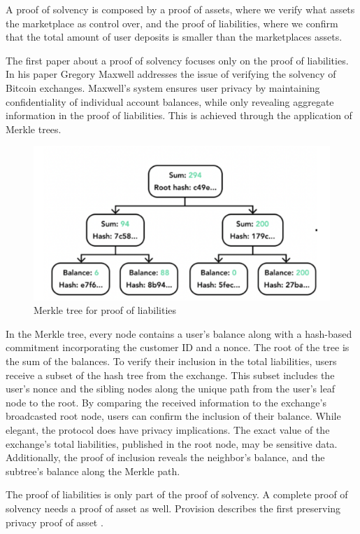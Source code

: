 A proof of solvency is composed by a proof of assets, where we verify what assets the marketplace as control over, and the proof of liabilities,
where we confirm that the total amount of user deposits is smaller than the marketplaces assets. 


The first paper about a proof of solvency focuses only on the proof of liabilities. In his paper Gregory Maxwell addresses the issue of verifying 
the solvency of Bitcoin exchanges. \cite{chainlink_blog}
Maxwell's system ensures user privacy by maintaining confidentiality of individual account balances, while only revealing aggregate information in the proof of liabilities. 
This is achieved through the application of Merkle trees. 

\begin{figure}[H]
    \centering
    \includegraphics[width=130mm]{MerkleTreeLiabilities.png}
    \caption{Merkle tree for proof of liabilities}
    \label{overflow}
    \end{figure}

In the Merkle tree, every node contains a user's balance along with a hash-based commitment incorporating the customer ID and a nonce. The root of the tree is the sum of the balances. 
To verify their inclusion in the total liabilities, users receive a subset of the hash tree from the exchange. This subset includes the user's nonce and the sibling nodes along the unique path from the user's leaf node to the root. 
By comparing the received information to the exchange's broadcasted root node, users can confirm the inclusion of their balance.
While elegant, the protocol does have privacy implications. The exact value of the exchange's total liabilities, published in the root node, may be sensitive data. 
Additionally, the proof of inclusion reveals the neighbor's balance, and the subtree's balance along the Merkle path. 

The proof of liabilities is only part of the proof of solvency. A complete proof of solvency needs a proof of asset as well.
Provision describes the first preserving privacy proof of asset \cite{DBBBCC15}.

